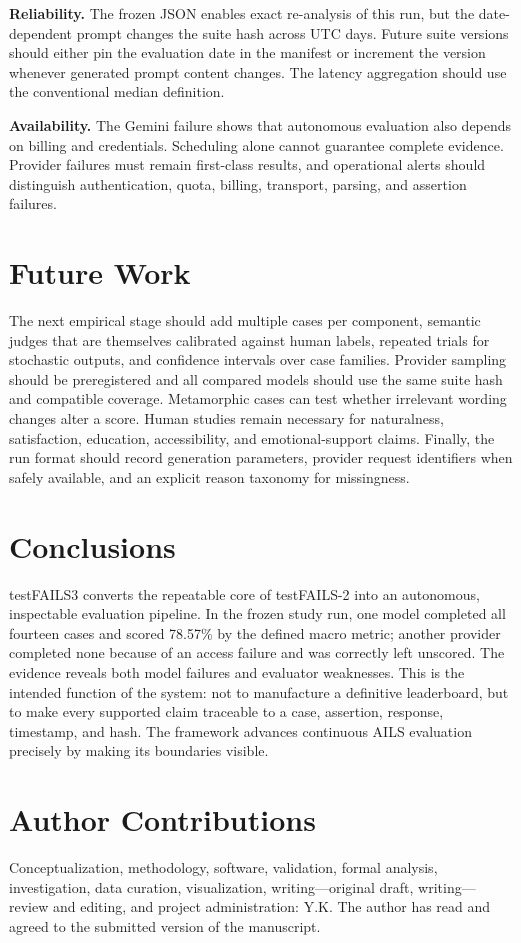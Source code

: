\documentclass[10pt,twocolumn]{article}
\newcommand{\system}{testFAILS3}
\begin{document}
\textbf{Reliability.} The frozen JSON enables exact re-analysis of this run, but the date-dependent prompt changes the suite hash across UTC days. Future suite versions should either pin the evaluation date in the manifest or increment the version whenever generated prompt content changes. The latency aggregation should use the conventional median definition.

\textbf{Availability.} The Gemini failure shows that autonomous evaluation also depends on billing and credentials. Scheduling alone cannot guarantee complete evidence. Provider failures must remain first-class results, and operational alerts should distinguish authentication, quota, billing, transport, parsing, and assertion failures.

\section{Future Work}
The next empirical stage should add multiple cases per component, semantic judges that are themselves calibrated against human labels, repeated trials for stochastic outputs, and confidence intervals over case families. Provider sampling should be preregistered and all compared models should use the same suite hash and compatible coverage. Metamorphic cases can test whether irrelevant wording changes alter a score. Human studies remain necessary for naturalness, satisfaction, education, accessibility, and emotional-support claims. Finally, the run format should record generation parameters, provider request identifiers when safely available, and an explicit reason taxonomy for missingness.

\section{Conclusions}
\system{} converts the repeatable core of testFAILS-2 into an autonomous, inspectable evaluation pipeline. In the frozen study run, one model completed all fourteen cases and scored 78.57\% by the defined macro metric; another provider completed none because of an access failure and was correctly left unscored. The evidence reveals both model failures and evaluator weaknesses. This is the intended function of the system: not to manufacture a definitive leaderboard, but to make every supported claim traceable to a case, assertion, response, timestamp, and hash. The framework advances continuous AILS evaluation precisely by making its boundaries visible.

\section*{Author Contributions}
Conceptualization, methodology, software, validation, formal analysis, investigation, data curation, visualization, writing---original draft, writing---review and editing, and project administration: Y.K. The author has read and agreed to the submitted version of the manuscript.
\end{document}
